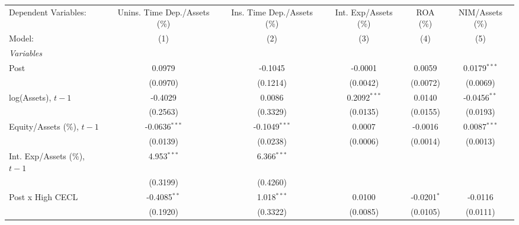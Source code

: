 
\begingroup
\centering
\begin{tabular}{lccccc}
   \tabularnewline \midrule \midrule
   Dependent Variables:                                   & Unins. Time Dep./Assets (\%)  & Ins. Time Dep./Assets (\%)  & Int. Exp/Assets (\%)  & ROA (\%)       & NIM/Assets (\%)\\   
   Model:                                                 & (1)                           & (2)                         & (3)                   & (4)            & (5)\\  
   \midrule
   \emph{Variables}\\
   Post                                                   & 0.0979                        & -0.1045                     & -0.0001               & 0.0059         & 0.0179$^{***}$\\   
                                                          & (0.0970)                      & (0.1214)                    & (0.0042)              & (0.0072)       & (0.0069)\\   
   log(Assets), $t{-}1$                                   & -0.4029                       & 0.0086                      & 0.2092$^{***}$        & 0.0140         & -0.0456$^{**}$\\   
                                                          & (0.2563)                      & (0.3329)                    & (0.0135)              & (0.0155)       & (0.0193)\\   
   Equity/Assets (\%), $t{-}1$                            & -0.0636$^{***}$               & -0.1049$^{***}$             & 0.0007                & -0.0016        & 0.0087$^{***}$\\   
                                                          & (0.0139)                      & (0.0238)                    & (0.0006)              & (0.0014)       & (0.0013)\\   
   Int. Exp/Assets (\%), $t{-}1$                          & 4.953$^{***}$                 & 6.366$^{***}$               &                       &                &   \\   
                                                          & (0.3199)                      & (0.4260)                    &                       &                &   \\   
   Post x High CECL                                       & -0.4085$^{**}$                & 1.018$^{***}$               & 0.0100                & -0.0201$^{*}$  & -0.0116\\   
                                                          & (0.1920)                      & (0.3322)                    & (0.0085)              & (0.0105)       & (0.0111)\\   

\end{tabular}
